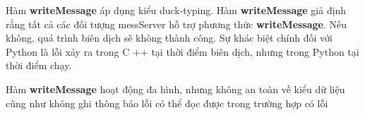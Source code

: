 Hàm \textbf{writeMessage} áp dụng kiểu duck-typing. Hàm \textbf{writeMessage} giả định rằng tất cả các đối tượng messServer hỗ trợ phương thức \textbf{writeMessage}. Nếu không, quá trình biên dịch sẽ không thành công. Sự khác biệt chính đối với Python là lỗi xảy ra trong C ++ tại thời điểm biên dịch, nhưng trong Python tại thời điểm chạy.

Hàm \textbf{writeMessage} hoạt động đa hình, nhưng không an toàn về kiểu dữ liệu cũng như không ghi thông báo lỗi có thể đọc được trong trường hợp có lỗi